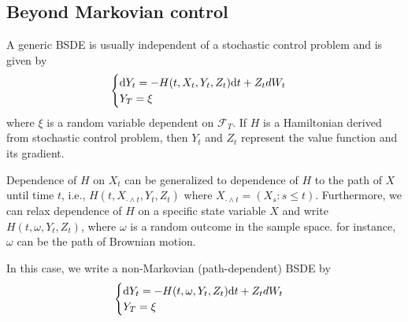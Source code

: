 \documentclass[11pt]{book}
\newcommand{\dd}{\text{\normalfont d}}
\newcommand{\dt}{\text{\normalfont d}t}
\begin{document}
\subsection{Beyond Markovian control}
A generic BSDE is usually independent of a stochastic control problem and is given by
\begin{equation}
    \label{eqn:BSDE}
    \begin{cases}
        \dd Y_t=-H(t,X_t,Y_t,Z_t)\dt + Z_t dW_t\\
        Y_T=\xi
    \end{cases}
\end{equation}
where $\xi$ is a random variable dependent on $\mathcal{F}_T$. If $H$ is a Hamiltonian derived from stochastic control problem, then $Y_t$ and $Z_t$ represent the value function and its gradient. 

Dependence of $H$ on $X_t$ can  be generalized to dependence of $H$ to the path of $X$ until time $t$, i.e., $H(t,X_{\cdot\wedge t},Y_t,Z_t)$ where $X_{\cdot\wedge t} = (X_s:s\le t)$. Furthermore, we can relax dependence of $H$ on a specific state variable $X$ and write $H(t,\omega,Y_t,Z_t)$, where $\omega$ is a random outcome in the sample space. for instance, $\omega$ can be the path of Brownian motion. 

In this case, we write a non-Markovian (path-dependent) BSDE by 
\begin{equation}
    \label{eqn:BSDE_nonMarkov}
    \begin{cases}
        \dd Y_t=-H(t,\omega,Y_t,Z_t)\dt + Z_t dW_t\\
        Y_T=\xi
    \end{cases}
\end{equation}
\end{document}
